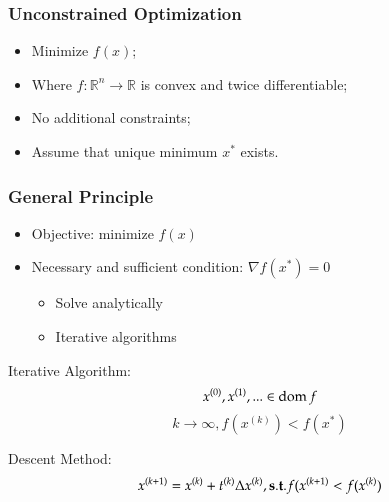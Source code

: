 

\newcommand\desmeth{x^{(k+1)} = x^{(k)} + t^{(k)}\Delta x^{(k)}}
\newcommand\satis{{\bf \small s.t}.   f(x^{(k+1)} < f(x^{(k)})}
\newcommand\xk[1]{x^{(#1)}}
\begin{frame}
  \frametitle{Unconstrained Optimization}
  \begin{itemize}
  \item Minimize $f(x)$;
    \item Where $f : \mathbb{R}^n \rightarrow \mathbb{R}$ is convex
      and twice differentiable;
    \item No additional constraints;
    \item Assume that unique minimum $x^*$ exists.
  \end{itemize}
\end{frame}

\begin{frame}
  \frametitle{General Principle}
  \begin{itemize}
  \item Objective: minimize $f(x)$
  \item Necessary and sufficient condition: $\nabla f(x^*) = 0$
    \begin{itemize}
    \item Solve analytically
    \item Iterative algorithms
    \end{itemize}
  \end{itemize}

  \begin{block}{ Iterative Algorithm:}
    $$\xk{0}, \xk{1}, ... \in \dom f$$
    $$k \rightarrow \infty, f(\xk{k}) < f(x^*) $$
  \end{block}

  \begin{block}{Descent Method:}
$$\desmeth,  \satis$$
  \end{block}

\end{frame}


